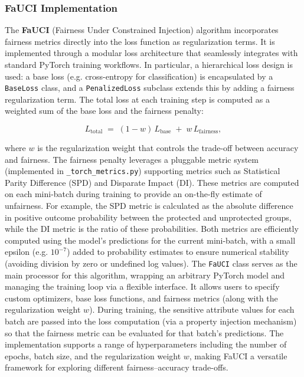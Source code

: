 \documentclass[12pt,a4paper,openright,twoside]{book}
\begin{document}
\subsubsection{FaUCI Implementation}
The \textbf{FaUCI} (Fairness Under Constrained Injection) algorithm incorporates fairness metrics directly into the loss function as regularization terms. It is implemented through a modular loss architecture that seamlessly integrates with standard PyTorch training workflows. In particular, a hierarchical loss design is used: a base loss (e.g. cross-entropy for classification) is encapsulated by a \texttt{BaseLoss} class, and a \texttt{PenalizedLoss} subclass extends this by adding a fairness regularization term. The total loss at each training step is computed as a weighted sum of the base loss and the fairness penalty:

\begin{equation}
    L_{\text{total}} \;=\; (1 - w)\,L_{\text{base}} \;+\; w\,L_{\text{fairness}},
\end{equation}

where $w$ is the regularization weight that controls the trade-off between accuracy and fairness. The fairness penalty leverages a pluggable metric system (implemented in \texttt{\_torch\_metrics.py}) supporting metrics such as Statistical Parity Difference (SPD) and Disparate Impact (DI). These metrics are computed on each mini-batch during training to provide an on-the-fly estimate of unfairness. For example, the SPD metric is calculated as the absolute difference in positive outcome probability between the protected and unprotected groups, while the DI metric is the ratio of these probabilities. Both metrics are efficiently computed using the model’s predictions for the current mini-batch, with a small epsilon (e.g. $10^{-7}$) added to probability estimates to ensure numerical stability (avoiding division by zero or undefined log values). The \texttt{FaUCI} class serves as the main processor for this algorithm, wrapping an arbitrary PyTorch model and managing the training loop via a flexible interface. It allows users to specify custom optimizers, base loss functions, and fairness metrics (along with the regularization weight $w$). During training, the sensitive attribute values for each batch are passed into the loss computation (via a property injection mechanism) so that the fairness metric can be evaluated for that batch’s predictions. The implementation supports a range of hyperparameters including the number of epochs, batch size, and the regularization weight $w$, making FaUCI a versatile framework for exploring different fairness–accuracy trade-offs.
\end{document}

